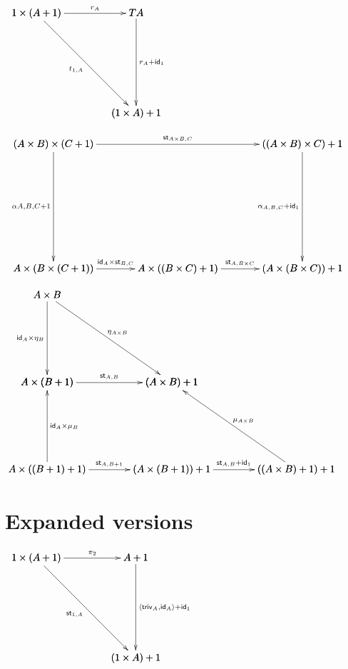 \documentclass{article}[12pt]
\begin{document}
  \begin{center}
    \begin{math}
      \bfig
      \scalefactor{2.0}
      \qtriangle[1 \times (A+1)`TA`(1 \times A) + 1;r_A`t_{1,A}`r_{A} + \id_1]
      \efig
    \end{math}
  \end{center}
  \begin{center}
    \begin{math}
      \bfig
      \scalefactor{2.5}
      \node topleft(0,500)[(A \times B) \times (C+1)]
      \node topright(1000,500)[((A \times B) \times C) + 1]
      \node botleft(0,0)[A \times (B \times (C + 1))]
      \node botmid(500,0)[A \times ((B \times C) + 1)]
      \node botright(1000,0)[(A \times (B \times C)) + 1]
      \arrow[topleft`topright;\st_{A \times B, C}]
      \arrow[topright`botright;\alpha_{A,B,C} + \id_1]
      \arrow[topleft`botleft;\alpha{A,B,C+1}]
      \arrow[botleft`botmid; \id_A \times \st_{B, C}]
      \arrow[botmid`botright;\st_{A, B \times C}]
      \efig
    \end{math}
  \end{center}
  \begin{center}
    \begin{math}
      \bfig
      \scalefactor{2.5}%
      \node AxB(0,700)[A \times B]%
      \node AxTB(0,350)[A \times (B + 1)]%
      \node AxT2B(0,0)[A \times ((B + 1) + 1)]%
      \node TAxB(500,350)[(A \times B) + 1]%
      \node TAxTB(500,0)[(A \times (B + 1)) + 1]%
      \node T2AxB(1000,0)[((A \times B) + 1) + 1]%
      \arrow[AxB`AxTB;\id_A \times \eta_B]%
      \arrow[AxT2B`AxTB;\id_A \times \mu_B]%
      \arrow[AxB`TAxB;\eta_{A \times B}]%
      \arrow[AxTB`TAxB;\st_{A,B}]%
      \arrow[AxT2B`TAxTB;\st_{A, B + 1}]%
      \arrow[TAxTB`T2AxB;\st_{A,B} + \id_1]%
      \arrow[T2AxB`TAxB;\mu_{A \times B}]%
      \efig
    \end{math}
  \end{center}

  \section{Expanded versions}
    \begin{center}
    \begin{math}
      \bfig
      \scalefactor{2.0}
      \qtriangle[1 \times (A+1)`A + 1`(1 \times A) + 1;\pi_2`\st_{1,A}`\langle \triv_A , \id_A \rangle + \id_1]
      \efig
    \end{math}
  \end{center}
\end{document}
